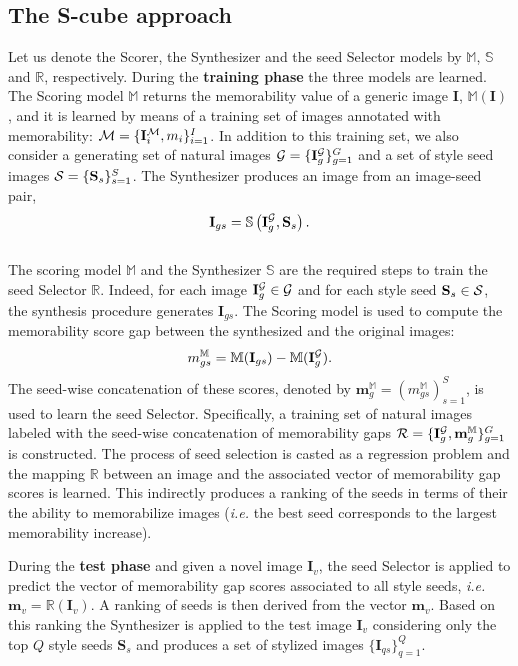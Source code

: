 \documentclass{sig-alternate-05-2015}
\begin{document}
\subsection{The S-cube approach}
\label{sec:scube}
Let us denote the Scorer, the Synthesizer and the seed Selector models by $\mathbb{M}$,  $\mathbb{S}$ and $\mathbb{R}$, respectively. During the \textbf{training phase} the three models are learned.
The Scoring model $\mathbb{M}$ returns the memorability value of a generic image $\mathbf{I}$, $\mathbb{M}(\mathbf{I})$, and it is learned by means of a training set of images annotated with memorability: ${\cal M}=\{\mathbf{I}_i^{\cal M},m_i\}_{i=1}^I$. In addition to this training set, we also consider a generating set of natural images ${\cal G}=\{\mathbf{I}_g^{\cal G}\}_{g=1}^G$ and a set of style seed images ${\cal S}=\{\mathbf{S}_s\}_{s=1}^S$. The Synthesizer produces an image from an image-seed pair, 
\begin{equation}
    \mathbf{I}_{gs} = \mathbb{S}\left(\mathbf{I}_g^{\cal G},\mathbf{S}_s\right).
\end{equation}\\
The scoring model $\mathbb{M}$ and the Synthesizer $\mathbb{S}$ are the required steps to train the seed Selector $\mathbb{R}$. Indeed, for each  image $\mathbf{I}_g^{\cal G}\in{\cal G}$ and for each style seed $\mathbf{S}_s\in{\cal S}$, the synthesis procedure generates $\mathbf{I}_{gs}$.
The Scoring model is used to compute the memorability score gap between the synthesized and the original images:
\begin{equation}
m_{gs}^\mathbb{M} = \mathbb{M} (\mathbf{I}_{gs}) - \mathbb{M} (\mathbf{I}_g^{\cal G}).
\end{equation}
The seed-wise concatenation of these scores, denoted by $\mathbf{m}_g^\mathbb{M} = (m_{gs}^\mathbb{M})_{s=1}^S$, is used to learn the seed Selector. Specifically, a training set of natural images labeled with the seed-wise concatenation of memorability gaps ${\cal R}=\{\mathbf{I}_g^{\cal G},\mathbf{m}_g^\mathbb{M}\}_{g=1}^{G}$ is constructed. The process of seed selection is casted as a regression problem and the mapping $\mathbb{R}$ between an image and the associated vector of memorability gap scores is learned. This indirectly produces a ranking of the seeds in terms of their the ability to memorabilize images (\textit{i.e.} the best seed corresponds to the largest memorability increase).

During the \textbf{test phase} and given a novel image $\mathbf{I}_v$, the seed Selector is applied to predict the vector of memorability gap scores associated to all style seeds, \textit{i.e.} $\mathbf{m}_v=\mathbb{R}(\mathbf{I}_v)$. A ranking of seeds is then derived from the vector $\mathbf{m}_v$. Based on this ranking the Synthesizer is applied to the test image $\textbf{I}_v$ considering only the top $Q$ style seeds $\textbf{S}_s$ and produces a set of stylized images $\{\mathbf{I}_{qs}\}_{q=1}^Q$. %
\end{document}
